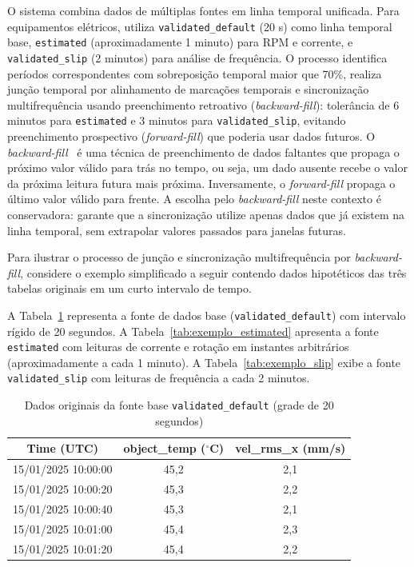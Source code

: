 O sistema combina dados de múltiplas fontes em linha temporal unificada. Para equipamentos elétricos, utiliza \texttt{validated\_\allowbreak default} (20 s) como linha temporal base, \texttt{estimated} (aproximadamente 1 minuto) para RPM e corrente, e \texttt{validated\_\allowbreak slip} (2 minutos) para análise de frequência. O processo identifica períodos correspondentes com sobreposição temporal maior que 70\%, realiza junção temporal por alinhamento de marcações temporais e sincronização multifrequência usando preenchimento retroativo (\textit{backward-fill}): tolerância de 6 minutos para \texttt{estimated} e 3 minutos para \texttt{validated\_\allowbreak slip}, evitando preenchimento prospectivo (\textit{forward-fill}) que poderia usar dados futuros. O \textit{backward-fill}~\cite{mckinney2010pandas} é uma técnica de preenchimento de dados faltantes que propaga o próximo valor válido para trás no tempo, ou seja, um dado ausente recebe o valor da próxima leitura futura mais próxima. Inversamente, o \textit{forward-fill} propaga o último valor válido para frente. A escolha pelo \textit{backward-fill} neste contexto é conservadora: garante que a sincronização utilize apenas dados que já existem na linha temporal, sem extrapolar valores passados para janelas futuras.

Para ilustrar o processo de junção e sincronização multifrequência por \textit{backward-fill}, considere o exemplo simplificado a seguir contendo dados hipotéticos das três tabelas originais em um curto intervalo de tempo.

A Tabela~\ref{tab:exemplo_default} representa a fonte de dados base (\texttt{validated\_default}) com intervalo rígido de 20 segundos. A Tabela~\ref{tab:exemplo_estimated} apresenta a fonte \texttt{estimated} com leituras de corrente e rotação em instantes arbitrários (aproximadamente a cada 1 minuto). A Tabela~\ref{tab:exemplo_slip} exibe a fonte \texttt{validated\_slip} com leituras de frequência a cada 2 minutos.

\begin{table}[H]
    \centering
    \caption{Dados originais da fonte base \texttt{validated\_default} (grade de 20 segundos)}
    \label{tab:exemplo_default}
    \begin{tabular}{ccc}
        \hline
        \textbf{Time (UTC)} & \textbf{object\_temp ($^\circ$C)} & \textbf{vel\_rms\_x (mm/s)} \\
        \hline
        15/01/2025 10:00:00 & 45,2 & 2,1 \\
        15/01/2025 10:00:20 & 45,3 & 2,2 \\
        15/01/2025 10:00:40 & 45,3 & 2,1 \\
        15/01/2025 10:01:00 & 45,4 & 2,3 \\
        15/01/2025 10:01:20 & 45,4 & 2,2 \\
        \hline
    \end{tabular}
\end{table}

